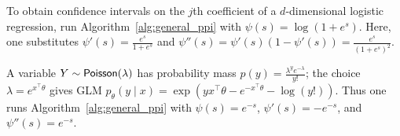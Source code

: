 \begin{example}
To obtain confidence intervals on the $j$th coefficient of a $d$-dimensional
logistic regression, run Algorithm~\ref{alg:general_ppi} with $\psi(s) =
\log(1 + e^{s})$.  Here, one substitutes $\psi'(s) =
\frac{e^s}{1+e^s}$ and $\psi''(s) = \psi'(s)(1-\psi'(s))
= \frac{e^s}{(1 + e^s)^2}$.
\end{example}

\begin{example}
  A variable $Y \sim \mathsf{Poisson}(\lambda)$ has
  probability mass $p(y) = \frac{\lambda^y e^{-\lambda}}{y!}$;
  the choice $\lambda = e^{x^\top \theta}$ gives GLM $p_\theta(y \mid x)
  = \exp(y x^\top \theta - e^{-x^\top \theta} - \log(y!))$. Thus
  one runs Algorithm~\ref{alg:general_ppi} with
  $\psi(s) = e^{-s}$, $\psi'(s) = - e^{-s}$, and
  $\psi''(s) = e^{-s}$.
\end{example}



